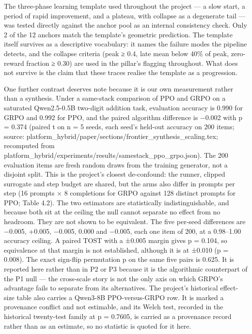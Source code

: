 \documentclass[12pt,a4paper]{report}
\begin{document}
The three-phase learning template used throughout the project --- a slow
start, a period of rapid improvement, and a plateau, with collapse as a
degenerate tail --- was tested directly against the anchor pool as an
internal consistency check. Only 2 of the 12 anchors match the
template's geometric prediction. The template itself survives as a
descriptive vocabulary: it names the failure modes the pipeline detects,
and the collapse criteria (peak ≥ 0.4, late mean below 40\% of peak,
zero-reward fraction ≥ 0.30) are used in the pillar's flagging
throughout. What does not survive is the claim that these traces realise
the template as a progression.

One further contrast deserves note because it is our own measurement
rather than a synthesis. Under a same-stack comparison of PPO and GRPO
on a saturated Qwen2.5-0.5B two-digit addition task, evaluation accuracy
is 0.990 for GRPO and 0.992 for PPO, and the paired algorithm difference
is −0.002 with p = 0.374 (paired t on n = 5 seeds, each seed's held-out
accuracy on 200 items; source:
platform\_hybrid/paper/sections/frontier\_\allowbreak{}synthesis\_\allowbreak{}scaling.tex;
recomputed from
platform\_hybrid/experiments/results/samestack\_\allowbreak{}ppo\_\allowbreak{}grpo.json). The 200
evaluation items are fresh random draws from the training generator, not
a disjoint split. This is the project's closest de-confound: the runner,
clipped surrogate and step budget are shared, but the arms also differ
in prompts per step (16 prompts × 8 completions for GRPO against 128
distinct prompts for PPO; Table 4.2). The two estimators are
statistically indistinguishable, and because both sit at the ceiling the
null cannot separate no effect from no headroom. They are not shown to
be equivalent. The five per-seed differences are −0.005, +0.005, −0.005,
0.000 and −0.005, each one item of 200, at a 0.98--1.00 accuracy
ceiling. A paired TOST with a ±0.005 margin gives p = 0.104, so
equivalence at that margin is not established, although it is at ±0.010
(p = 0.008). The exact sign-flip permutation p on the same five pairs is
0.625. It is reported here rather than in P2 or P3 because it is the
algorithmic counterpart of the P1 null --- the cross-scale story is not
the only axis on which GRPO's advantage fails to separate from its
alternatives. The project's historical effect-size table also carries a
Qwen3-8B PPO-versus-GRPO row. It is marked a provenance conflict and not
estimable, and its Welch test, recorded in the historical twenty-test
family at p = 0.7605, is carried as a provenance record rather than as
an estimate, so no statistic is quoted for it here.
\end{document}
